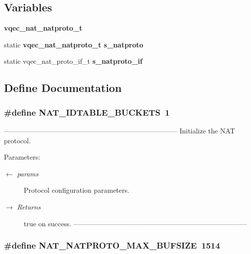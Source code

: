 \subsection*{Variables}
\begin{CompactItemize}
\item 
\bf{vqec\_\-nat\_\-natproto\_\-t}
\item 
static \bf{vqec\_\-nat\_\-natproto\_\-t} \bf{s\_\-natproto}
\item 
static vqec\_\-nat\_\-proto\_\-if\_\-t \bf{s\_\-natproto\_\-if}
\end{CompactItemize}


\subsection{Define Documentation}
\subsubsection{\setlength{\rightskip}{0pt plus 5cm}\#define NAT\_\-IDTABLE\_\-BUCKETS~1}\label{vqec__nat__natproto_8c_64f5fa1cf3c4c1d51022c23dd40dbcb9}


--------------------------------------------------------------------------- Initialize the NAT protocol.

\begin{Desc}
\item[Parameters:]
\begin{description}
\item[\mbox{$\leftarrow$} {\em params}]Protocol configuration parameters. \item[\mbox{$\rightarrow$} {\em Returns}]true on success. --------------------------------------------------------------------------- \end{description}
\end{Desc}
\subsubsection{\setlength{\rightskip}{0pt plus 5cm}\#define NAT\_\-NATPROTO\_\-MAX\_\-BUFSIZE~1514}\label{vqec__nat__natproto_8c_b4ec4fd0169de62b3afbc650db17684f}



